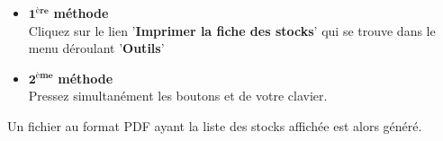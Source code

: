 \begin{itemize}[]
	\item \textcolor{purplish}{$\mathbf{1^{\text{\`ere}}}$ \textbf{m\'ethode}}\\
		Cliquez sur le lien '\textbf{Imprimer la fiche des stocks}'
		qui se trouve dans le menu d\'eroulant '\textbf{Outils}'\\

	\item \textcolor{purplish}{$\mathbf{2^{\text{\`eme}}}$ \textbf{m\'ethode}}\\
		Pressez simultan\'ement les boutons 
		et  de votre clavier.\\
\end{itemize}

Un fichier au format PDF ayant la liste des stocks affich\'ee
est alors g\'en\'er\'e.

{}

